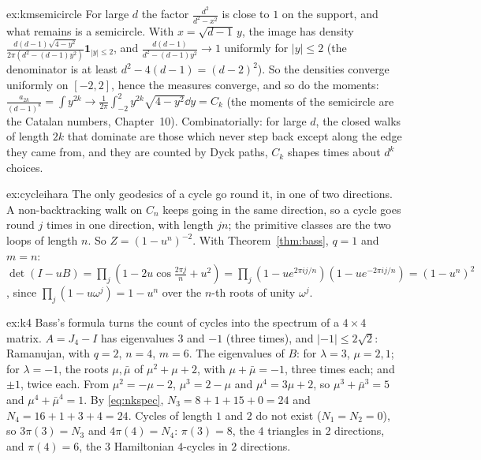\begin{solution}{ex:kmsemicircle}
\idea For large $d$ the factor $\frac{d^2}{d^2-x^2}$ is close to $1$ on the support, and what remains is a semicircle.
\writeup With $x=\sqrt{d-1}\,y$, the image has density $\frac{d(d-1)\sqrt{4-y^2}}{2\pi(d^2-(d-1)y^2)}\mathbf 1_{|y|\le2}$, and $\frac{d(d-1)}{d^2-(d-1)y^2}\to1$ uniformly for $|y|\le2$ (the denominator is at least $d^2-4(d-1)=(d-2)^2$). So the
densities converge uniformly on $[-2,2]$, hence the measures converge, and so do the moments: $\frac{a_{2k}}{(d-1)^k}=\int y^{2k}\to\frac1{2\pi}\int_{-2}^2y^{2k}\sqrt{4-y^2}\dd y=C_k$ (the moments of the semicircle are the Catalan numbers, Chapter~10). Combinatorially:
for large $d$, the closed walks of length $2k$ that dominate are those which never step back except along the edge they came from, and they are counted by Dyck paths, $C_k$ shapes times about $d^k$ choices.
\end{solution}

\begin{solution}{ex:cycleihara}
\idea The only geodesics of a cycle go round it, in one of two directions.
\writeup A non-backtracking walk on $C_n$ keeps going in the same direction, so a cycle goes round $j$ times in one direction, with length $jn$; the primitive classes are the two loops of length $n$. So $Z=(1-u^n)^{-2}$. With
Theorem~\ref{thm:bass}, $q=1$ and $m=n$: $\det(I-uB)=\prod_j(1-2u\cos\frac{2\pi j}n+u^2)=\prod_j(1-ue^{2\pi ij/n})(1-ue^{-2\pi ij/n})=(1-u^n)^2$, since $\prod_j(1-u\omega^j)=1-u^n$ over the $n$-th roots of unity $\omega^j$.
\end{solution}

\begin{solution}{ex:k4}
\idea Bass's formula turns the count of cycles into the spectrum of a $4\times4$ matrix.
\writeup $A=J_4-I$ has eigenvalues $3$ and $-1$ (three times), and $|-1|\le2\sqrt2$: Ramanujan, with $q=2$, $n=4$, $m=6$. The eigenvalues of $B$: for $\lambda=3$, $\mu=2,1$; for $\lambda=-1$, the roots $\mu,\bar\mu$ of $\mu^2+\mu+2$, with
$\mu+\bar\mu=-1$, three times each; and $\pm1$, twice each. From $\mu^2=-\mu-2$, $\mu^3=2-\mu$ and $\mu^4=3\mu+2$, so $\mu^3+\bar\mu^3=5$ and $\mu^4+\bar\mu^4=1$. By \eqref{eq:nkspec}, $N_3=8+1+15+0=24$ and $N_4=16+1+3+4=24$. Cycles of
length $1$ and $2$ do not exist ($N_1=N_2=0$), so $3\pi(3)=N_3$ and $4\pi(4)=N_4$: $\pi(3)=8$, the $4$ triangles in $2$ directions, and $\pi(4)=6$, the $3$ Hamiltonian $4$-cycles in $2$ directions.
\end{solution}

